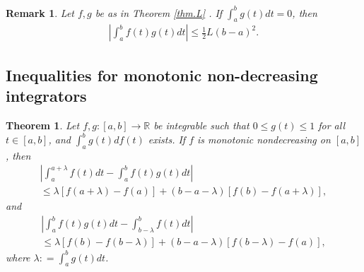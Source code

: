 \documentclass{amsart}
\newtheorem{theorem}{Theorem}
\theoremstyle{plain}
\newtheorem{remark}{Remark}
\numberwithin{equation}{section}
\begin{document}
\begin{remark}
Let $f,g$ be as in Theorem \ref{thm.L} . If $\int_a^b {g\left( t
\right)dt} =0 $, then
\begin{align}
\left| { \int_a^b {f\left( t \right)g\left( t \right)dt} } \right|
\le \frac{1}{2}L\left( {b - a} \right)^2.
\end{align}
\end{remark}

\subsection{Inequalities for monotonic non-decreasing integrators}
\begin{theorem}
\label{thm.Mono}Let $f,g : [a,b] \to \mathbb{R}$ be integrable
such that $0 \le g(t) \le 1$ for all $t \in [a,b]$, and $\int_a^b
{g\left( t \right)df\left( t \right)}$ exists. If $f$ is monotonic
nondecreasing on $[a,b]$, then
\begin{multline}
\label{eq2.12}\left| {\int_a^{a + \lambda } {f\left( t \right)dt}
- \int_a^b {f\left( t \right)g\left( t \right)dt} } \right|
\\
\le \lambda \left[ {f\left( {a + \lambda } \right) - f\left( a
\right)} \right] + \left( {b - a - \lambda } \right)\left[
{f\left( b \right) - f\left( {a + \lambda } \right)} \right],
\end{multline}
and
\begin{multline}
\label{eq2.13}\left| {\int_a^b {f\left( t \right)g\left( t
\right)dt} -  \int_{b - \lambda }^b {f\left( t \right)dt}} \right|
\\
\le \lambda\left[ {f\left( b \right) - f\left( {b - \lambda }
\right)} \right] + \left( {b - a - \lambda } \right) \left[
{f\left( {b - \lambda } \right) - f\left( a \right)} \right],
\end{multline}
where $\lambda : = \int_a^b {g\left( t \right)dt}$.
\end{theorem}
\end{document}
